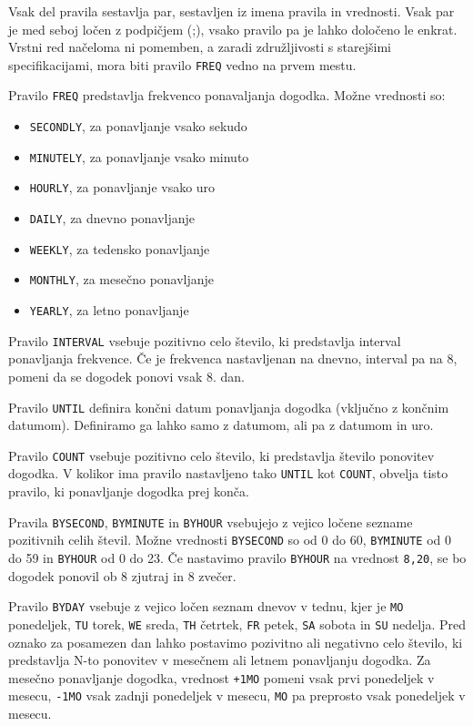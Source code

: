 Vsak del pravila sestavlja par, sestavljen iz imena pravila in vrednosti. Vsak par je med seboj ločen z podpičjem (;), vsako pravilo pa je lahko določeno le enkrat. Vrstni red načeloma ni pomemben, a zaradi združljivosti s starejšimi specifikacijami, mora biti pravilo \texttt{FREQ} vedno na prvem mestu.

Pravilo \texttt{FREQ} predstavlja frekvenco ponavaljanja dogodka. Možne vrednosti so:

\begin{itemize}
  \item \texttt{SECONDLY}, za ponavljanje vsako sekudo
  \item \texttt{MINUTELY}, za ponavljanje vsako minuto
  \item \texttt{HOURLY}, za ponavljanje vsako uro
  \item \texttt{DAILY}, za dnevno ponavljanje
  \item \texttt{WEEKLY}, za tedensko ponavljanje
  \item \texttt{MONTHLY}, za mesečno ponavljanje
  \item \texttt{YEARLY}, za letno ponavljanje
\end{itemize}

Pravilo \texttt{INTERVAL} vsebuje pozitivno celo število, ki predstavlja interval ponavljanja frekvence. Če je frekvenca nastavljenan na dnevno, interval pa na 8, pomeni da se dogodek ponovi vsak 8. dan.

Pravilo \texttt{UNTIL} definira končni datum ponavljanja dogodka (vključno z končnim datumom). Definiramo ga lahko samo z datumom, ali pa z datumom in uro.

Pravilo \texttt{COUNT} vsebuje pozitivno celo število, ki predstavlja število ponovitev dogodka. V kolikor ima pravilo nastavljeno tako \texttt{UNTIL} kot \texttt{COUNT}, obvelja tisto pravilo, ki ponavljanje dogodka prej konča.

Pravila \texttt{BYSECOND}, \texttt{BYMINUTE} in \texttt{BYHOUR} vsebujejo z vejico ločene sezname pozitivnih celih števil. Možne vrednosti \texttt{BYSECOND} so od 0 do 60, \texttt{BYMINUTE} od 0 do 59 in \texttt{BYHOUR} od 0 do 23. Če nastavimo pravilo \texttt{BYHOUR} na vrednost \texttt{8,20}, se bo dogodek ponovil ob 8 zjutraj in 8 zvečer.

Pravilo \texttt{BYDAY} vsebuje z vejico ločen seznam dnevov v tednu, kjer je \texttt{MO} ponedeljek, \texttt{TU} torek, \texttt{WE} sreda, \texttt{TH} četrtek, \texttt{FR} petek, \texttt{SA} sobota in \texttt{SU} nedelja. Pred oznako za posamezen dan lahko postavimo pozivitno ali negativno celo število, ki predstavlja N-to ponovitev v mesečnem ali letnem ponavljanju dogodka. Za mesečno ponavljanje dogodka, vrednost \texttt{+1MO} pomeni vsak prvi ponedeljek v mesecu, \texttt{-1MO} vsak zadnji ponedeljek v mesecu, \texttt{MO} pa preprosto vsak ponedeljek v mesecu.

